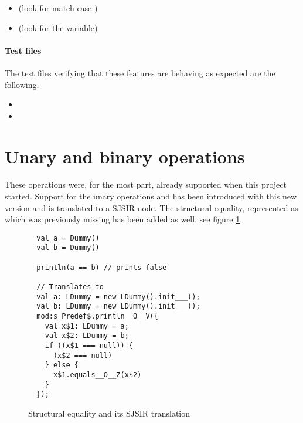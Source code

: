 \begin{itemize}
 \item {} (look for match case )
 \item {} (look for the  variable)
\end{itemize}

\paragraph{Test files} The test files verifying that these features are behaving as 
expected are the following.

\begin{itemize}
 \item {}
 \item {}
\end{itemize}

\section{Unary and binary operations}

\paragraph{} These operations were, for the most part, already supported when this project 
started. Support for the  unary operations  and  has been 
introduced with this new version and is translated to a  SJSIR node. The 
structural equality, represented as \ktinline{==} which was previously missing has been added as 
well, see figure \ref{struct_equal}.

\begin{figure}[h]
 \begin{verbatim}
  val a = Dummy()
  val b = Dummy()

  println(a == b) // prints false
  
  // Translates to
  val a: LDummy = new LDummy().init___();
  val b: LDummy = new LDummy().init___();
  mod:s_Predef$.println__O__V({
    val x$1: LDummy = a;
    val x$2: LDummy = b;
    if ((x$1 === null)) {
      (x$2 === null)
    } else {
      x$1.equals__O__Z(x$2)
    }
  });
 \end{verbatim}
  \caption{Structural equality and its SJSIR translation}
  \label{struct_equal}
\end{figure}


